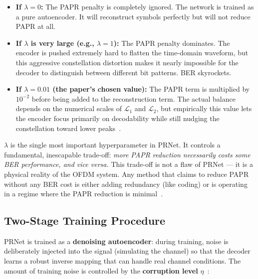 \begin{itemize}
    \item \textbf{If $\lambda = 0$:} The PAPR penalty is completely ignored.
          The network is trained as a pure autoencoder.  It will reconstruct
          symbols perfectly but will not reduce PAPR at all.

    \item \textbf{If $\lambda$ is very large (e.g., $\lambda = 1$):} The
          PAPR penalty dominates.  The encoder is pushed extremely hard to
          flatten the time-domain waveform, but this aggressive constellation
          distortion makes it nearly impossible for the decoder to distinguish
          between different bit patterns.  BER skyrockets.

    \item \textbf{If $\lambda = 0.01$ (the paper's chosen value):} The PAPR
          term is multiplied by $10^{-2}$ before being added to the
          reconstruction term.  The actual balance depends on the numerical
          scales of $\mathcal{L}_1$ and $\mathcal{L}_2$, but empirically this
          value lets the encoder focus primarily on decodability while still
          nudging the constellation toward lower peaks~\cite{kim2017novel}.
\end{itemize}

\begin{keyinsight}
    $\lambda$ is the single most important hyperparameter in PRNet.
    It controls a fundamental, inescapable trade-off: \emph{more PAPR
    reduction necessarily costs some BER performance, and vice versa.}
    This trade-off is not a flaw of PRNet --- it is a physical reality
    of the OFDM system.  Any method that claims to reduce PAPR without
    any BER cost is either adding redundancy (like coding) or is
    operating in a regime where the PAPR reduction is
    minimal~\cite{kim2017novel}.
\end{keyinsight}


\subsection{Two-Stage Training Procedure}

PRNet is trained as a \textbf{denoising autoencoder}: during training,
noise is deliberately injected into the signal (simulating the channel)
so that the decoder learns a robust inverse mapping that can handle real
channel conditions.  The amount of training noise is controlled by the
\textbf{corruption level} $\eta$~\cite{kim2017novel}:

